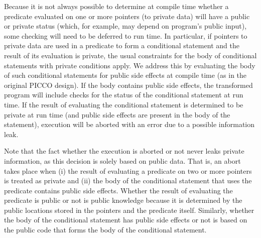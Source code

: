 \documentclass[11pt]{article}
\begin{document}
Because it is not always possible to determine at compile time whether a
predicate evaluated on one or more pointers (to private data) will have a
public or private status (which, for example, may depend on program's public
input), some checking will need to be deferred to run time. In particular,
if pointers to private data are used in a predicate to form a conditional
statement and the result of its evaluation is private, the usual constraints
for the body of conditional statements with private conditions apply. We
address this by evaluating the body of such conditional statements for
public side effects at compile time (as in the original PICCO design). If
the body contains public side effects, the transformed program will include
checks for the status of the conditional statement at run time. If the
result of evaluating the conditional statement is determined to be private
at run time (and public side effects are present in the body of the
statement), execution will be aborted with an error due to a possible
information leak.

Note that the fact whether the execution is aborted or not never leaks
private information, as this decision is solely based on public
data. That is, an abort takes place when (i) the result of evaluating
a predicate on two or more pointers is treated as private and (ii) the
body of the conditional statement that uses the predicate contains
public side effects. Whether the result of evaluating the predicate is
public or not is public knowledge because it is determined by the
public locations stored in the pointers and the predicate
itself. Similarly, whether the body of the conditional statement has
public side effects or not is based on the public code that forms the
body of the conditional statement.
\end{document}
